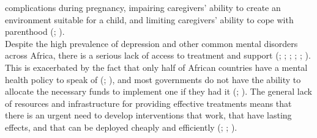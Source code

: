 \documentclass[stu,a4paper,12pt,donotrepeattitle]{apa7}
\begin{document}
complications during pregnancy, impairing caregivers' ability to create an
environment suitable for a child, and limiting caregivers' ability to cope with
parenthood (\cite{fernaetal21}; \cite{nyatetal16}).\\
Despite the high prevalence of depression and other common mental disorders
across Africa, there is a serious lack of access to treatment and support
(\cite{chibandaetal11}; \cite{chibandaetal15}; \cite{chibandaetal16};
\cite{douketal21}; \cite{fernaetal21}; \cite{logetal18}). This is exacerbated
by the fact that only half of African countries have a mental health policy to
speak of (\cite{lunetal14}; \cite{lunderal15}), and most governments do not have
the ability to allocate the necessary funds to implement one if they had it
(\cite{douketal21}; \cite{logetal18}). The general lack of resources and
infrastructure for providing effective treatments means that there is an urgent
need to develop interventions that work, that have lasting effects, and that can
be deployed cheaply and efficiently (\cite{douketal21}; \cite{lunetal14};
\cite{lunderal15}).
\end{document}
